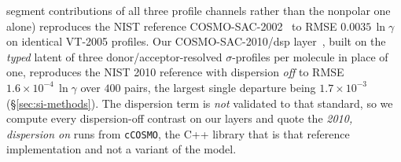 segment contributions of all three profile channels rather than the nonpolar one
alone) reproduces the NIST reference COSMO-SAC-2002~\cite{bell2020cosmosac} to RMSE
$0.0035\,\ln\gamma$ on identical VT-2005 profiles. Our COSMO-SAC-2010/dsp
layer~\cite{hsieh2010,hsieh2014dsp}, built on the \emph{typed} latent of three donor/acceptor-resolved
$\sigma$-profiles per molecule in place of one, reproduces the NIST 2010 reference with dispersion
\emph{off} to RMSE $1.6\times10^{-4}\,\ln\gamma$ over $400$ pairs, the largest single departure
being $1.7\times10^{-3}$
(\S\ref{sec:si-methods}). The dispersion term is \emph{not} validated to that standard, so we compute every
dispersion-off contrast on our layers and quote the \emph{2010, dispersion on} runs
from \texttt{cCOSMO}, the C++ library that is that reference implementation
\cite{bell2020cosmosac} and not a variant of the model.

